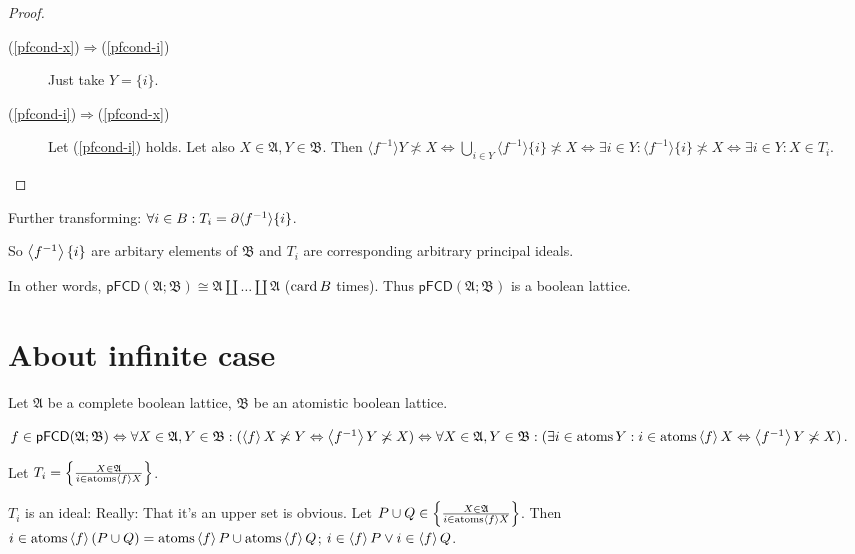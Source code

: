 \begin{proof}
  
  \begin{description}
    \item[(\ref{pfcond-x})$\Rightarrow$(\ref{pfcond-i})] Just take $Y = \{ i
    \}$.
    
    \item[(\ref{pfcond-i})$\Rightarrow$(\ref{pfcond-x})] Let (\ref{pfcond-i})
    holds. Let also $X \in \mathfrak{A}, Y \in \mathfrak{B}$. Then $\langle
    f^{- 1} \rangle Y \nasymp X \Leftrightarrow \bigcup_{i \in Y} \langle f^{-
    1} \rangle \{ i \} \nasymp X \Leftrightarrow \exists i \in Y : \langle
    f^{- 1} \rangle \{ i \} \nasymp X \Leftrightarrow \exists i \in Y : X \in
    T_i$.
  \end{description}
\end{proof}

Further transforming: $\forall i \in B : T_i = \partial \langle f^{- 1}
\rangle \{ i \}$.

So $\left\langle f^{- 1}\right\rangle \{ i \}$ are arbitary elements of $\mathfrak{B}$
and $T_i$ are corresponding arbitrary principal ideals.

In other words, $\mathsf{pFCD} (\mathfrak{A}; \mathfrak{B}) \cong \mathfrak{A}
\amalg \ldots \amalg \mathfrak{A}$ ($\operatorname{card} B$ times). Thus $\mathsf{pFCD}
(\mathfrak{A}; \mathfrak{B})$ is a boolean lattice.

\section{About infinite case}

Let $\mathfrak{A}$ be a complete boolean lattice, $\mathfrak{B}$ be an
atomistic boolean lattice.

$f \in \mathsf{pFCD} (\mathfrak{A}; \mathfrak{B}) \Leftrightarrow \forall X \in
\mathfrak{A}, Y \in \mathfrak{B}: (\left\langle f\right\rangle X \not\asymp Y
\Leftrightarrow \left\langle f^{- 1}\right\rangle Y \not\asymp X) \Leftrightarrow \forall X
\in \mathfrak{A}, Y \in \mathfrak{B}: (\exists i \in \operatorname{atoms} Y : i \in
\operatorname{atoms} \left\langle f\right\rangle X \Leftrightarrow \left\langle f^{- 1}\right\rangle Y
\not\asymp X)$.

Let $T_i = \left\{ \frac{ X \in \mathfrak{A} }{ i \in
\operatorname{atoms} \left\langle f\right\rangle X }\right\}$.

$T_i$ is an ideal: Really: That it's an upper set is obvious. Let $P \cup Q
\in \left\{ \frac{ X \in \mathfrak{A} }{ i \in \operatorname{atoms}
\left\langle f\right\rangle X }\right\}$. Then $i \in \operatorname{atoms} \left\langle f\right\rangle (P
\cup Q) = \operatorname{atoms} \left\langle f\right\rangle P \cup \operatorname{atoms} \left\langle f\right\rangle
Q$; $i \in \left\langle f\right\rangle P \vee i \in \left\langle f\right\rangle Q$.

